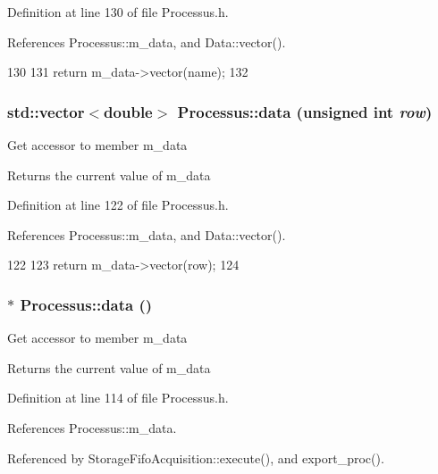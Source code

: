 Definition at line 130 of file Processus.h.

References Processus::m\_\-data, and Data::vector().


\begin{DoxyCode}
130                                         {
131     return m_data->vector(name);
132   }
\end{DoxyCode}
\hypertarget{classProcessus_aa7c57483cf4b9ab0b2d0ae2de8316402}{
\subsubsection[{data}]{\setlength{\rightskip}{0pt plus 5cm}std::vector$<$double$>$ Processus::data (unsigned int {\em row})}}
\label{classProcessus_aa7c57483cf4b9ab0b2d0ae2de8316402}
Get accessor to member m\_\-data \begin{DoxyReturn}{Returns}
the current value of m\_\-data 
\end{DoxyReturn}


Definition at line 122 of file Processus.h.

References Processus::m\_\-data, and Data::vector().


\begin{DoxyCode}
122                                           {
123     return m_data->vector(row);
124   }
\end{DoxyCode}
\hypertarget{classProcessus_a16e45f329fbce935aeef0ff3cb508228}{
\subsubsection[{data}]{$\ast$ Processus::data ()}}
\label{classProcessus_a16e45f329fbce935aeef0ff3cb508228}
Get accessor to member m\_\-data \begin{DoxyReturn}{Returns}
the current value of m\_\-data 
\end{DoxyReturn}


Definition at line 114 of file Processus.h.

References Processus::m\_\-data.

Referenced by StorageFifoAcquisition::execute(), and export\_\-proc().


